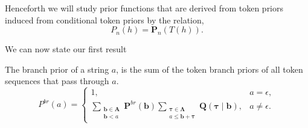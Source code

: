 Henceforth we will study prior functions that are derived from token
priors induced from conditional token priors by the relation,
$$
P_n(h) = \mathbf{P}_n(T(h)).
$$

We can now state our first result

\begin{theorem}
\label{theorem:token-prior-path-summation}
    The branch prior of a string $a$, is the sum of the token branch priors of all
    token sequences that pass through $a$.
    $$
    P^{br}(a)=
    \begin{cases}
        1, & a=\epsilon,\\[4pt]
        \displaystyle
        \sum_{\substack{\mathbf{b} \in \mathbf{A} \\ \mathbf{b} < a}} 
        \mathbf{P}^{br}(\mathbf{b})
        \sum_{\substack{\boldsymbol{\tau} \in \mathbf{\Lambda} \\ a \leq \mathbf{b} + \boldsymbol{\tau}}}
        \mathbf{Q}(\boldsymbol{\tau} \mid \mathbf{b}), & a \neq \epsilon.
    \end{cases}
    $$
\end{theorem}
